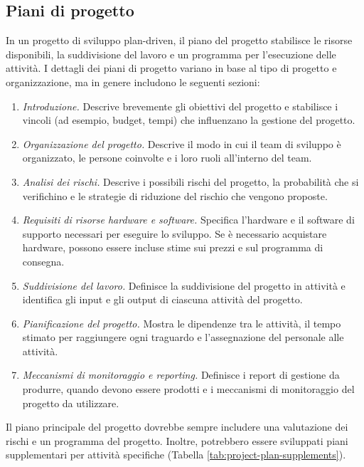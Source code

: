 \subsection{Piani di progetto}
In un progetto di sviluppo plan-driven, il piano del progetto stabilisce le risorse disponibili, la suddivisione del lavoro e un programma per l'esecuzione delle attività. I dettagli dei piani di progetto variano in base al tipo di progetto e organizzazione, ma in genere includono le seguenti sezioni:
\begin{enumerate}    
    \item \textit{Introduzione.} Descrive brevemente gli obiettivi del progetto e stabilisce i vincoli (ad esempio, budget, tempi) che influenzano la gestione del progetto.
    \item \textit{Organizzazione del progetto.} Descrive il modo in cui il team di sviluppo è organizzato, le persone coinvolte e i loro ruoli all'interno del team.
    \item \textit{Analisi dei rischi.} Descrive i possibili rischi del progetto, la probabilità che si verifichino e le strategie di riduzione del rischio che vengono proposte.
    \item \textit{Requisiti di risorse hardware e software.} Specifica l'hardware e il software di supporto necessari per eseguire lo sviluppo. Se è necessario acquistare hardware, possono essere incluse stime sui prezzi e sul programma di consegna.
    \item \textit{Suddivisione del lavoro.} Definisce la suddivisione del progetto in attività e identifica gli input e gli output di ciascuna attività del progetto.
    \item \textit{Pianificazione del progetto.} Mostra le dipendenze tra le attività, il tempo stimato per raggiungere ogni traguardo e l'assegnazione del personale alle attività.
    \item \textit{Meccanismi di monitoraggio e reporting.} Definisce i report di gestione da produrre, quando devono essere prodotti e i meccanismi di monitoraggio del progetto da utilizzare.
\end{enumerate}
Il piano principale del progetto dovrebbe sempre includere una valutazione dei rischi e un programma del progetto. Inoltre, potrebbero essere sviluppati piani supplementari per attività specifiche (Tabella \ref{tab:project-plan-supplements}).

